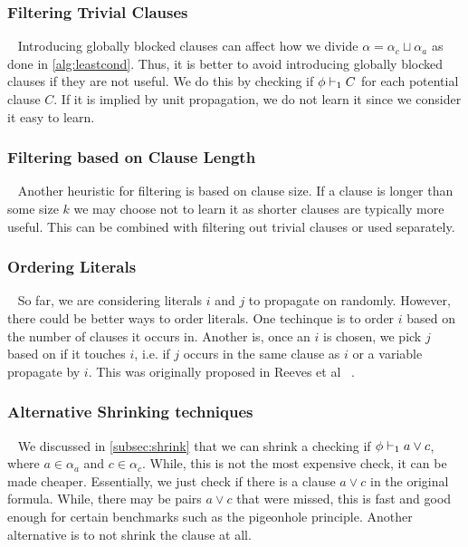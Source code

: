 \subsubsection{Filtering Trivial Clauses}~\label{subsubsec:filteringtriv}
Introducing globally blocked clauses can affect how we divide $\alpha = \alpha_c
\sqcup \alpha_a$ as done in \autoref{alg:leastcond}. Thus, it is better to avoid
introducing globally blocked clauses if they are not useful. We do this by
checking if $\phi \vdash_1 C$ for each potential clause $C$. If it is implied by
unit propagation, we do not learn it since we consider it easy to learn.

\subsubsection{Filtering based on Clause Length}~\label{subsubsec:filtering-length}
Another heuristic for filtering is based on clause size. If a clause is longer
than some size $k$ we may choose not to learn it as shorter clauses are
typically more useful. This can be combined with filtering out trivial clauses
or used separately.

\subsubsection{Ordering Literals}~\label{subsubsec:ordering-literals}
So far, we are considering literals $i$ and $j$ to propagate on randomly.
However, there could be better ways to order literals. One techinque is to order
$i$ based on the number of clauses it occurs in. Another is, once an $i$ is
chosen, we pick $j$ based on if it touches $i$, i.e. if $j$ occurs in the same
clause as $i$ or a variable propagate by $i$. This was originally proposed in
Reeves et al ~\cite{prelearn}.

\subsubsection{Alternative Shrinking techniques}~\label{subsubsec:shrink-techniques}
We discussed in \autoref{subsec:shrink} that we can shrink a checking if $\phi
\vdash_1 a \lor c$, where $a \in \alpha_a$ and $c \in \alpha_c$. While, this is
not the most expensive check, it can be made cheaper. Essentially, we just check
if there is a clause $a \lor c$ in the original formula. While, there may be
pairs $a \lor c$ that were missed, this is fast and good enough for certain
benchmarks such as the pigeonhole principle. Another alternative is to not
shrink the clause at all.


